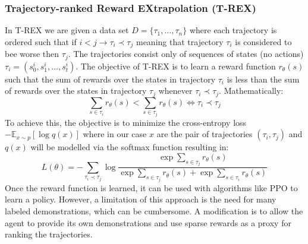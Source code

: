 \subsubsection{ Trajectory-ranked Reward EXtrapolation (T-REX)}
In T-REX \cite{brown2019extrapolatingsuboptimaldemonstrationsinverse} we are given a data set  $D = \{\tau_1,\dots,\tau_n\}$ where each trajectory is 
ordered such that if $i<j \rightarrow \tau_i \prec \tau_j$ meaning that trajectory 
$\tau_i$ is considered to bee worse then $\tau_j$. The trajectories consist only of
sequences of states (no actions) $\tau_i = (s_0^i,s_1^i,\dots,s_t^i)$. \newline
The objective of T-REX is to learn a reward function $r_\theta(s)$ such that the sum of 
rewards over the states in trajectory $\tau_i$ is less than the sum of rewards over the 
states in trajectory  $\tau_j$ whenever $ \tau_i \prec \tau_j$. Mathematically:
$$ \underset{s \in \tau_i}{\sum} r_\theta(s) < \underset{s \in \tau_j}{\sum} r_\theta(s) \iff  \tau_i \prec \tau_j $$ 
To achieve this, the objective is to minimize the cross-entropy loss $-\mathbb{E}_{x\sim p}[\log{q(x)}]$ where in our 
case $x$ are the pair of trajectories $(\tau_i,\tau_j)$ and $q(x)$ will be modelled via the softmax function resulting in: 
$$L(\theta) = - \underset{\tau_i \prec \tau_j}{\sum}\log{\frac{\exp{\sum_{s \in \tau_j}}r_\theta(s)}{\exp{\sum_{s \in \tau_j}}r_\theta(s)+\exp{\sum_{s \in \tau_i}}r_\theta(s)}}$$ 
Once the reward function is learned, it can be used with algorithms like PPO to learn a policy.
\newline
However, a limitation of this approach is the need for many labeled demonstrations, which 
can be cumbersome. A modification is to allow the agent to provide its own demonstrations 
and use sparse rewards as a proxy for ranking the trajectories.

